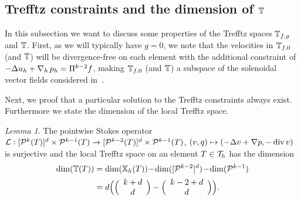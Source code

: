 \documentclass[pdflatex,sn-mathphys,Numbered]{sn-jnl}%
\theoremstyle{remark}%
\newtheorem{lemma}[theorem]{Lemma}
\theoremstyle{definition}%
\begin{document}
\subsection{Trefftz constraints and the dimension of
\texorpdfstring{$\mathbb{T}$}{T}} \label{sec:dofs} In this subsection we want
to discuss some properties of the Trefftz spaces $\mathbb{T}_{f,g}$ and
$\mathbb{T}$. First, as we will typically have $g=0$, we note that the
velocities in $\mathbb{T}_{f,0}$ (and $\mathbb{T}$) will be divergence-free on each
element with the additional constraint of $-\Delta u_h+\operatorname{\nabla}_h p_h=
\Pi^{k-2} f$, making $\mathbb{T}_{f,0}$ (and $\mathbb{T}$) a subspace of the
solenoidal vector fields considered in~\cite{BJK90,montlaur2010discontinuous}.

Next, we proof that a particular solution to the Trefftz constraints
always exist. Furthermore we state the dimension of the local Trefftz
space.
\begin{lemma} \label{lem:surj} The pointwise Stokes operator $\mathcal{L} :
 [\mathcal{P}^{k}(T)]^d \times \mathcal{P}^{k-1}(T) \to [\mathcal{P}^{k-2}(T)]^d \times
 \mathcal{P}^{k-1}(T)$, $(v,q) \mapsto (-\Delta v + \nabla p, - \operatorname{\mathrm{div}} v)$ is
 surjective and the local Trefftz space on an element $T\in{\mathcal{T}_h}$ has
 the dimension
\begin{align} \label{eq:dimTT}
\dim( \mathbb{T}(T)) & = 
\dim(\mathbb{X}_h(T)) \!-\! \dim([\mathcal{P}^{k-2}]^d) \!-\! \dim(\mathcal{P}^{k-1})
\\ & =
d \Big(  \Big( \begin{array}{c} k + d \\ d \end{array} \Big) - \Big( \begin{array}{c} k- 2 + d \\ d \end{array} \Big)  \Big). \nonumber
\end{align}
\end{lemma}
\end{document}
